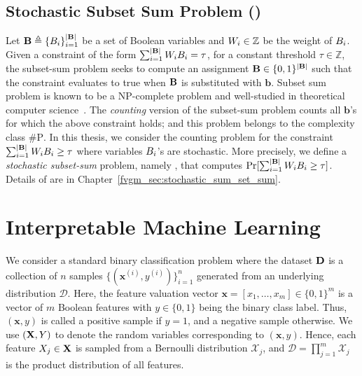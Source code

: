\subsection{Stochastic Subset Sum Problem ({\stochastic})} 
Let $ \mathbf{B} \triangleq \{B_i\}_{i=1}^{|\mathbf{B}|}$ be a set of Boolean variables and $ W_i \in \mathbb{Z} $ be the weight of $ B_i $. Given a constraint of the form  $\sum_{i = 1}^ {|\mathbf{B}|} W_i B_i = \tau $, for a constant threshold $ \tau \in \mathbb{Z} $, the subset-sum problem seeks to compute an assignment $\mathbf{B} \in \{0,1\}^{|\mathbf{B}|}$ such that the constraint evaluates to true when $\mathbf{B}$ is substituted with $ \mathbf{b} $. Subset sum problem is known to be a $ \mathrm{NP} $-complete problem and well-studied in theoretical computer science~\cite{kleinberg2006algorithm}. The \textit{counting} version of the subset-sum problem counts all $  \mathbf{b}  $'s for which the above constraint holds; and this problem belongs to the complexity class $ \mathrm{\#P} $. In this thesis, we consider the counting problem for the constraint $\sum_{i = 1}^ {|\mathbf{B}|} W_i B_i \ge \tau $ where variables $ B_i $'s are stochastic. More precisely, we define a \textit{stochastic subset-sum} problem, namely {\stochastic}, that computes $ \Pr[\sum_{i = 1}^ {|\mathbf{B}|} W_iB_i \ge \tau] $.    Details of {\stochastic} are in Chapter~\ref{fvgm_sec:stochastic_sum_set_sum}.




\section{Interpretable Machine Learning}
\label{chapter_interpretability_preliminaries}


We consider a standard binary classification problem where the dataset $ \mathbf{D} $ is a collection of $ n $ samples  $\{(\mathbf{x}^{(i)}, y^{(i)})\}_{i=1}^n$ generated from an underlying distribution $\mathcal{D}$.  Here, the feature valuation vector $ \mathbf{x} = [x_1, \dots, x_{m}] \in \{0, 1\}^m $ is a vector of $ m $ Boolean features with $ y \in \{0,1\} $ being the binary class label. Thus, $ (\mathbf{x}, y) $ is called a positive sample if $ y = 1 $, and a negative sample otherwise.  We use $ (\mathbf{X}, Y) $ to denote the random variables corresponding to $ (\mathbf{x}, y) $. Hence, each feature $ X_j \in \mathbf{X} $ is sampled from a Bernoulli distribution $ \mathcal{X}_j $, and $ \mathcal{D} = \prod_{j=1}^m \mathcal{X}_j  $ is the product distribution of all features. 





